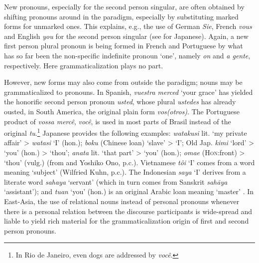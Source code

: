 New pronouns, especially for the second person singular, are often obtained by shifting pronouns around in the paradigm, especially by substituting marked forms for unmarked ones. This explains, e.g., the use of German \textit{Sie}, French \textit{vous} and English \textit{you} for the second person singular (see \citealt[112]{Syromjatnikov1980} for Japanese). Again, a new first person plural pronoun is being formed in French and Portuguese by what has so far been the non-specific indefinite pronoun ‘one’, namely \textit{on} and \textit{a gente}, respectively. Here grammaticalization plays no part.

However, new forms may also come from outside the paradigm; nouns may be grammaticalized to pronouns. In Spanish, \textit{vuestra merced} ‘your grace’ has yielded the honorific second person pronoun \textit{usted}, whose plural \textit{ustedes} has already ousted, in South America, the original plain form \textit{vos(otros)}. The Portuguese product of \textit{vossa mercê}, \textit{você}, is used in most parts of Brasil instead of the original \textit{tu}.\footnote{In Rio de Janeiro, even dogs are addressed by \textit{você}.} Japanese provides the following examples: \textit{watakusi} lit. ‘my private affair’ {\textgreater} \textit{watasi} ‘I’ (hon.); \textit{boku} (Chinese loan) ‘slave’ {\textgreater} ‘I’; Old Jap. \textit{kimi} ‘lord’ {\textgreater} ‘you’ (hon.) {\textgreater} ‘thou’; \textit{anata} lit. ‘that part’ {\textgreater} ‘you’ (hon.); \textit{omae} (\textsc{Hon}:front) {\textgreater} ‘thou’ (vulg.) (from \citealt{Syromjatnikov1980} and Yoshiko Ono, p.c.). Vietnamese \textit{tôi} ‘I’ comes from a word meaning ‘subject’ (Wilfried Kuhn, p.c.). The Indonesian \textit{saya} ‘I’ derives from a literate word \textit{sahaya} ‘servant’ (which in turn comes from Sanskrit \textit{sah\=aya} ‘assistant’); and \textit{tuan} ‘you’ (hon.) is an original Arabic loan meaning ‘master’ \citep[152]{Gabelentz1891}. In East-Asia, the use of relational nouns instead of personal pronouns whenever there is a personal relation between the discourse participants is wide-spread and liable to yield rich material for the grammaticalization origin of first and second person pronouns.

